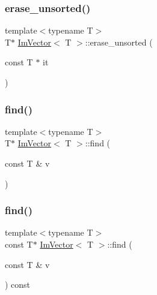 \mbox{\label{structImVector_af3bb8157615f4d38b1faf04a5e11b96f}} 
\subsubsection{\texorpdfstring{erase\+\_\+unsorted()}{erase\_unsorted()}}
{\footnotesize\ttfamily template$<$typename T$>$ \\
T$\ast$ \hyperlink{structImVector}{Im\+Vector}$<$ T $>$\+::erase\+\_\+unsorted (\begin{DoxyParamCaption}\item[{const T $\ast$}]{it }\end{DoxyParamCaption})\hspace{0.3cm}{\ttfamily [inline]}}

\mbox{\label{structImVector_a1fd56218ff1441843df8c9f1aef54fdc}} 
\subsubsection{\texorpdfstring{find()}{find()}\hspace{0.1cm}{\footnotesize\ttfamily [1/2]}}
{\footnotesize\ttfamily template$<$typename T$>$ \\
T$\ast$ \hyperlink{structImVector}{Im\+Vector}$<$ T $>$\+::find (\begin{DoxyParamCaption}\item[{const T \&}]{v }\end{DoxyParamCaption})\hspace{0.3cm}{\ttfamily [inline]}}

\mbox{\label{structImVector_ada7d8e0e66b8619562cb2fa3830c8f8d}} 
\subsubsection{\texorpdfstring{find()}{find()}\hspace{0.1cm}{\footnotesize\ttfamily [2/2]}}
{\footnotesize\ttfamily template$<$typename T$>$ \\
const T$\ast$ \hyperlink{structImVector}{Im\+Vector}$<$ T $>$\+::find (\begin{DoxyParamCaption}\item[{const T \&}]{v }\end{DoxyParamCaption}) const\hspace{0.3cm}{\ttfamily [inline]}}

